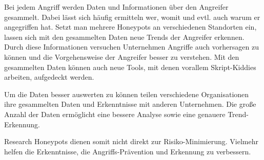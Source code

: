Bei jedem Angriff werden Daten und Informationen über den Angreifer gesammelt. Dabei lässt sich häufig ermitteln wer, womit und evtl. auch warum er angegriffen hat. Setzt man mehrere Honeypots an verschiedenen Standorten ein, lassen sich mit den gesammelten Daten neue Trends der Angreifer erkennen. Durch diese Informationen versuchen Unternehmen Angriffe auch vorhersagen zu können und die Vorgehensweise der Angreifer besser zu verstehen. Mit den gesammelten Daten können auch neue Tools, mit denen vorallem Skript-Kiddies arbeiten, aufgedeckt werden.

Um die Daten besser auswerten zu können teilen verschiedene Organisationen ihre gesammelten Daten und Erkenntnisse mit anderen Unternehmen. Die große Anzahl der Daten ermöglicht eine bessere Analyse sowie eine genauere Trend-Erkennung. 

Research Honeypots dienen somit nicht direkt zur Risiko-Minimierung. Vielmehr helfen die Erkenntnisse, die Angriffs-Prävention und Erkennung zu verbessern.